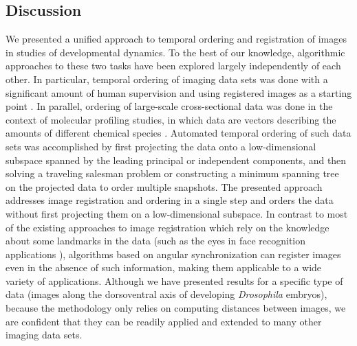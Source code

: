 \documentclass{pnastwo}
\begin{document}
\begin{article}
\section{Discussion}

We presented a unified approach to temporal ordering and registration of images in studies of developmental dynamics. 
%
To the best of our knowledge, algorithmic approaches to these two tasks have been explored largely independently of each other. 
%
In particular, temporal ordering of imaging data sets was done with a significant amount of human supervision and using registered images as a starting point \cite{yuan2014automated, surkova2008characterization}.  
%
In parallel, ordering of large-scale cross-sectional data was done in the context of molecular profiling studies, in which data are vectors describing the amounts of different chemical species \cite{anavy2014blind, trapnell2014dynamics, gupta2008extracting}. 
%
Automated temporal ordering of such data sets was accomplished by first projecting the data onto a low-dimensional subspace spanned by the leading principal or independent components, and then solving a traveling salesman problem or constructing a minimum spanning tree on the projected data to order multiple snapshots. 
%
The presented approach addresses image registration and ordering in a single step and orders the data without first projecting them on a low-dimensional subspace.
%
%
In contrast to most of the existing approaches to image registration which rely on the knowledge about some landmarks in the data \cite{ian1998statistical} (such as the eyes in face recognition applications \cite{zhao2003face}), algorithms based on angular synchronization can register images even in the absence of such information, making them applicable to a wide variety of applications. 
%
Although we have presented results for a specific type of data (images along the dorsoventral axis of developing {\em Drosophila} embryos), because the methodology only relies on computing distances between images, we are confident that they can be readily applied and extended to many other imaging data sets. 


\end{article}
\end{document}
